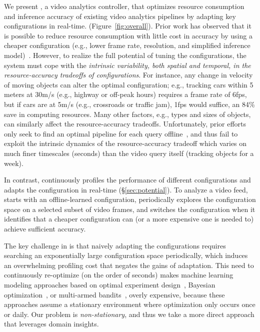 {We present {\em \name}, a video analytics controller, that optimizes 
resource consumption and inference accuracy of existing video 
analytics pipelines by adapting key \nn configurations in real-time.
(Figure~\ref{fig:overall}).
Prior work has observed that it is possible to reduce resource 
consumption with little cost in accuracy by using a cheaper \nn 
configuration (e.g., lower frame rate, resolution, and simplified
inference model)~\cite{videostar,noscope}.
However, to realize the full potential of tuning the \nn configurations,
the system must cope with the {\em intrinsic variability, both spatial
and temporal, in the resource-accuracy tradeoffs of \nn configurations}.
For instance, any change in velocity of moving objects can alter
the optimal \nn configuration;
e.g., tracking cars within 5 meters at 30m/s (e.g., highway or 
off-peak hours) requires a frame rate of 6fps, but if cars are at 5m/s 
(e.g., crossroads or traffic jam), 1fps would suffice, 
an 84\% save in computing resources.
Many other factors, e.g., types and sizes of objects,
can similarly affect the resource-accuracy tradeoffs.
Unfortunately, prior efforts only seek to find an optimal pipeline for
each query offline~\cite{videostar,noscope,vigil,mcdnn}, and thus fail
to exploit the intrinsic dynamics of the resource-accuracy tradeoff
which varies on much finer timescales (\eg seconds) than the video query
itself (\eg tracking objects for a week).

In contrast, \name continuously profiles the performance of different 
\nn configurations and adapts the \nn configuration in real-time
(\S\ref{sec:potential}). 
To analyze a video feed, \name starts with an offline-learned \nn 
configuration, periodically explores the configuration space
on a selected subset of video frames, and switches the configuration
when it identifies that a cheaper configuration can (or a more 
expensive one is needed to) achieve sufficient accuracy.

The key challenge in \name is that naively adapting the configurations 
requires searching an exponentially large configuration space 
periodically, which induces an overwhelming profiling cost that negates 
the gains of adaptation. This need to continuously re-optimize (\eg on 
the order of seconds) makes machine learning modeling approaches based on optimal experiment design~\cite{ernest}, Bayesian optimization~\cite{cherrypick}, or 
multi-armed bandits~\cite{amazon-bandit}, overly expensive, because these approaches 
assume a stationary environment where optimization only occurs once or daily. Our problem is {\em non-stationary}, and thus we take a more direct approach that leverages domain insights.

}
